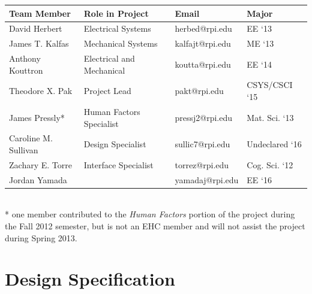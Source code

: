 \documentclass[12pt,oneside,final]{article}
\begin{document}
\begin{table}[h]
  \centering \small
  \begin{tabular}{l l l l }
    \hline
    Team Member           & Role in Project           & Email           & Major         \\
    \hline
    David Herbert         & Electrical Systems        & herbed@rpi.edu  & EE `13        \\
    James T. Kalfas       & Mechanical Systems        & kalfajt@rpi.edu & ME `13        \\
    Anthony Kouttron      & Electrical and Mechanical & koutta@rpi.edu  & EE `14        \\
    Theodore X. Pak       & Project Lead              & pakt@rpi.edu    & CSYS/CSCI `15 \\
    James Pressly*        & Human Factors Specialist  & pressj2@rpi.edu & Mat. Sci. `13 \\
    Caroline M. Sullivan  & Design Specialist         & sullic7@rpi.edu & Undeclared `16\\
    Zachary E. Torre      & Interface Specialist      & torrez@rpi.edu  & Cog. Sci. `12 \\
    Jordan Yamada         &                           & yamadaj@rpi.edu & EE `16        \\
    \hline
  \end{tabular}\\
  * one member contributed to the \emph{Human Factors} portion of the project during the Fall 2012 semester, but is not an EHC member and will not assist the project during Spring 2013.
\end{table}


\pagebreak
\section{Design Specification}
\label{sec:spec}
\end{document}
